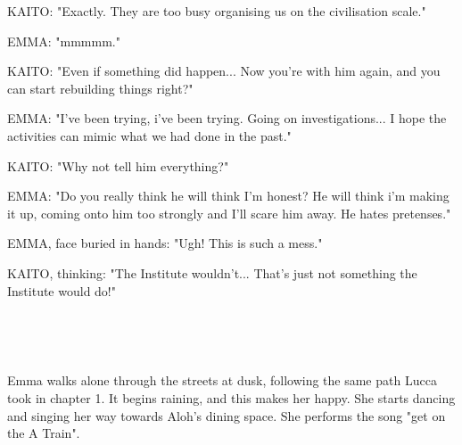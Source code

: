 \documentclass[11pt]{article}
\begin{document}
KAITO: "Exactly. They are too busy organising us on the civilisation scale."

EMMA: "mmmmm."

KAITO: "Even if something did happen...
Now you're with him again, and you can start rebuilding things right?"

EMMA: "I've been trying, i've been trying. 
Going on investigations... I hope the activities can mimic what we had done in the past."

KAITO: "Why not tell him everything?"

EMMA: "Do you really think he will think I'm honest?
He will think i'm making it up, coming onto him too strongly and I'll scare him away.
He hates pretenses."

EMMA, face buried in hands: "Ugh! This is such a mess."

KAITO, thinking: "The Institute wouldn't...
That's just not something the Institute would do!"


\ 

\ 

Emma walks alone through the streets at dusk, following the same path Lucca took in chapter 1.
It begins raining, and this makes her happy. 
She starts dancing and singing her way towards Aloh's dining space.
She performs the song "get on the A Train".
\end{document}
